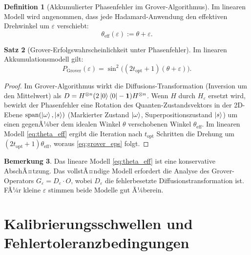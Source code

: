 ﻿\documentclass[11pt,a4paper]{article}
\theoremstyle{definition}
\newtheorem{theorem}{Satz}[section]
\newtheorem{definition}[theorem]{Definition}
\newtheorem{remark}[theorem]{Bemerkung}
\newcommand{\eps}{\varepsilon}
\newcommand{\Heps}{H_{\!\varepsilon}}
\begin{document}
\begin{definition}[Akkumulierter Phasenfehler im Grover-Algorithmus]
  Im linearen Modell wird angenommen, dass jede Hadamard-Anwendung den
  effektiven Drehwinkel um $\eps$ verschiebt:
  \begin{equation}
    \theta_{\mathrm{eff}}(\eps) := \theta + \eps.
    \label{eq:theta_eff}
  \end{equation}
\end{definition}

\begin{theorem}[Grover-Erfolgswahrscheinlichkeit unter Phasenfehler]
\label{thm:grover}
  Im linearen Akkumulationsmodell gilt:
  \begin{equation}
    P_{\mathrm{Grover}}(\eps) = \sin^2\bigl((2t_{\mathrm{opt}}+1)(\theta+\eps)\bigr).
    \label{eq:grover_eps}
  \end{equation}
\end{theorem}

\begin{proof}
  Im Grover-Algorithmus wirkt die Diffusions-Transformation (Inversion um den
  Mittelwert) als $D = H^{\otimes n}(2\ket{0}\bra{0}-\mathbf{1})H^{\otimes n}$.
  Wenn $H$ durch $\Heps$ ersetzt wird, bewirkt der Phasenfehler eine Rotation
  des Quanten-Zustandsvektors in der 2D-Ebene $\mathrm{span}(\ket{\omega},\ket{s})$
  (Markierter Zustand $\ket{\omega}$, Superpositionszustand $\ket{s}$) um einen
  gegenÃ¼ber dem idealen Winkel $\theta$ verschobenen Winkel $\theta_{\mathrm{eff}}$.
  Im linearen Modell \eqref{eq:theta_eff} ergibt die Iteration nach $t_{\mathrm{opt}}$
  Schritten die Drehung um $(2t_{\mathrm{opt}}+1)\theta_{\mathrm{eff}}$, woraus
  \eqref{eq:grover_eps} folgt.
\end{proof}

\begin{remark}
  Das lineare Modell \eqref{eq:theta_eff} ist eine konservative AbschÃ¤tzung.
  Das vollstÃ¤ndige Modell erfordert die Analyse des Grover-Operators
  $G_\eps = D_\eps \cdot O$, wobei $D_\eps$ die fehlerbesetzte
  Diffusionstransformation ist.  FÃ¼r kleine $\eps$ stimmen beide Modelle
  gut Ã¼berein.
\end{remark}

\section{Kalibrierungsschwellen und Fehlertoleranzbedingungen}
\label{sec:threshold}
\end{document}

